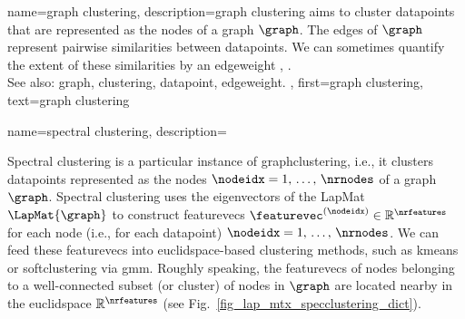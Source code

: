 {name={graph clustering},
	description={\Gls{graph} \gls{clustering} aims to 
		cluster \glspl{datapoint} that are represented as the nodes 
		of a \gls{graph} $\graph$. The edges of $\graph$ represent 
		pairwise similarities between \glspl{datapoint}. We can sometimes
		quantify the extent of these similarities by an \gls{edgeweight} \cite{FlowSpecClustering2021}, \cite{Luxburg2007}.
					\\ 
		See also: \gls{graph}, \gls{clustering}, \gls{datapoint}, \gls{edgeweight}. }, 
	first={graph clustering},
	text={graph clustering} 
}

{name={spectral clustering},
	description={Spectral \gls{clustering} is a particular instance of 
		\gls{graphclustering}, i.e., it clusters \glspl{datapoint} 
		represented as the nodes $\nodeidx=1, \,\ldots, \,\nrnodes$ of a \gls{graph} $\graph$. 
		Spectral \gls{clustering} uses the \glspl{eigenvector} of the \gls{LapMat} $\LapMat{\graph}$ 
		to construct \glspl{featurevec} $\featurevec^{(\nodeidx)} \in \mathbb{R}^{\nrfeatures}$ 
		for each node (i.e., for each \gls{datapoint}) $\nodeidx=1, \,\ldots, \,\nrnodes$. We can feed these \glspl{featurevec} 
		into \gls{euclidspace}-based \gls{clustering} methods, such as \gls{kmeans} 
		or \gls{softclustering} via \gls{gmm}. Roughly speaking, the \glspl{featurevec} of nodes 
		belonging to a well-connected subset (or \gls{cluster}) of nodes in $\graph$ are located 
		nearby in the \gls{euclidspace} $\mathbb{R}^{\nrfeatures}$ (see Fig.\ \ref{fig_lap_mtx_specclustering_dict}). 
		\begin{figure}[H]
			\begin{center}
				\begin{minipage}{0.4\textwidth}
\end{minipage}
\end{center}
\end{figure}}}
